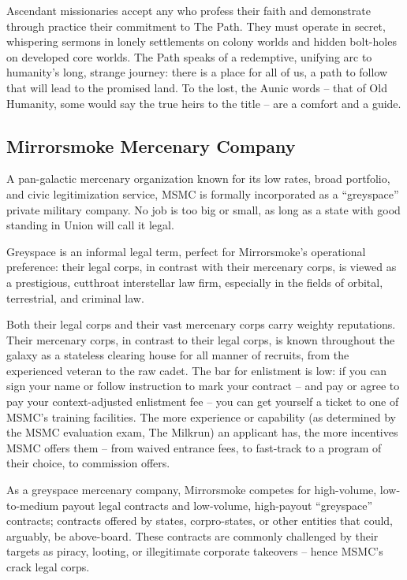 Ascendant missionaries accept any who profess their faith and demonstrate through practice
their commitment to The Path. They must operate in secret, whispering sermons in lonely
settlements on colony worlds and hidden bolt-holes on developed core worlds. The Path speaks
of a redemptive, unifying arc to humanity's long, strange journey: there is a place for all of us, a
path to follow that will lead to the promised land. To the lost, the Aunic words -- that of Old
Humanity, some would say the true heirs to the title -- are a comfort and a guide.

\subsection{Mirrorsmoke Mercenary Company}

A pan-galactic mercenary organization known for its low rates, broad portfolio, and civic
legitimization service, MSMC is formally incorporated as a ``greyspace'' private military company.
No job is too big or small, as long as a state with good standing in Union will call it legal.

Greyspace is an informal legal term, perfect for Mirrorsmoke's operational preference: their legal
corps, in contrast with their mercenary corps, is viewed as a prestigious, cutthroat interstellar law
firm, especially in the fields of orbital, terrestrial, and criminal  law.

Both their legal corps and their vast mercenary corps carry weighty reputations. Their mercenary
corps, in contrast to their legal corps, is known throughout the galaxy as a stateless clearing
house for all manner of recruits, from the experienced veteran to the raw cadet. The bar for
enlistment is low: if you can sign your name or follow instruction to mark your contract -- and
pay or agree to pay your context-adjusted enlistment fee -- you can get yourself a ticket to one
of MSMC's training facilities. The more experience or capability (as determined by the MSMC
evaluation exam, The Milkrun) an applicant has, the more incentives MSMC offers them -- from
waived entrance fees, to fast-track to a program of their choice, to commission offers.

As a greyspace mercenary company, Mirrorsmoke competes for high-volume, low-to-medium
payout legal contracts and low-volume, high-payout ``greyspace'' contracts; contracts offered by
states, corpro-states, or other entities that could, arguably, be above-board. These contracts are
commonly challenged by their targets as piracy, looting, or illegitimate corporate takeovers --
hence MSMC's crack legal corps.

